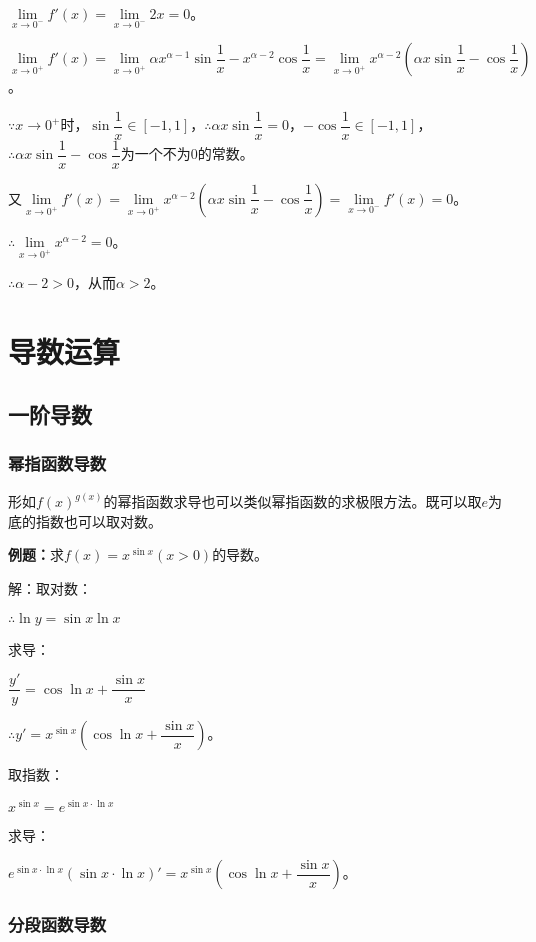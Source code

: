 \documentclass[UTF8, 12pt]{ctexart}
\begin{document}
$\lim\limits_{x\to 0^-}f'(x)=\lim\limits_{x\to 0^-}2x=0$。

$\lim\limits_{x\to 0^+}f'(x)=\lim\limits_{x\to 0^+}\alpha x^{\alpha-1}\sin\dfrac{1}{x}-x^{\alpha-2}\cos\dfrac{1}{x}=\lim\limits_{x\to 0^+}x^{\alpha-2}\left(\alpha x\sin\dfrac{1}{x}-\cos\dfrac{1}{x}\right)$。

$\because x\to 0^+$时，$\sin\dfrac{1}{x}\in[-1,1]$，$\therefore\alpha x\sin\dfrac{1}{x}=0$，$-\cos\dfrac{1}{x}\in[-1,1]$，$\therefore \alpha x\sin\dfrac{1}{x}-\cos\dfrac{1}{x}$为一个不为0的常数。

又$\lim\limits_{x\to 0^+}f'(x)=\lim\limits_{x\to 0^+}x^{\alpha-2}\left(\alpha x\sin\dfrac{1}{x}-\cos\dfrac{1}{x}\right)=\lim\limits_{x\to 0^-}f'(x)=0$。

$\therefore\lim\limits_{x\to 0^+}x^{\alpha-2}=0$。

$\therefore\alpha-2>0$，从而$\alpha>2$。

\section{导数运算}

\subsection{一阶导数}

\subsubsection{幂指函数导数}

形如$f(x)^{g(x)}$的幂指函数求导也可以类似幂指函数的求极限方法。既可以取$e$为底的指数也可以取对数。

\textbf{例题：}求$f(x)=x^{\sin x}(x>0)$的导数。

解：取对数：

$\therefore\ln y=\sin x\ln x$

求导：

$\dfrac{y'}{y}=\cos\ln x+\dfrac{\sin x}{x}$

$\therefore y'=x^{\sin x}\left(\cos\ln x+\dfrac{\sin x}{x}\right)$。

取指数：

$x^{\sin x}=e^{\sin x\cdot\ln x}$

求导：

$e^{\sin x\cdot\ln x}(\sin x\cdot\ln x)'=x^{\sin x}\left(\cos\ln x+\dfrac{\sin x}{x}\right)$。

\subsubsection{分段函数导数}
\end{document}
